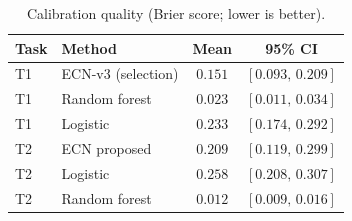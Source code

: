 \begin{table}[!t]
\centering
\caption{Calibration quality (Brier score; lower is better).}
\label{tab:cal}
\renewcommand{\arraystretch}{1.1}
{\footnotesize\begin{tabular}{llcc}
\toprule
Task & Method & Mean & 95\% CI \\
\midrule
T1 & ECN-v3 (selection) & $0.151$ & $[0.093,\,0.209]$ \\
T1 & Random forest & $0.023$ & $[0.011,\,0.034]$ \\
T1 & Logistic & $0.233$ & $[0.174,\,0.292]$ \\
T2 & ECN proposed & $0.209$ & $[0.119,\,0.299]$ \\
T2 & Logistic & $0.258$ & $[0.208,\,0.307]$ \\
T2 & Random forest & $0.012$ & $[0.009,\,0.016]$ \\
\bottomrule
\end{tabular}}
\end{table}
